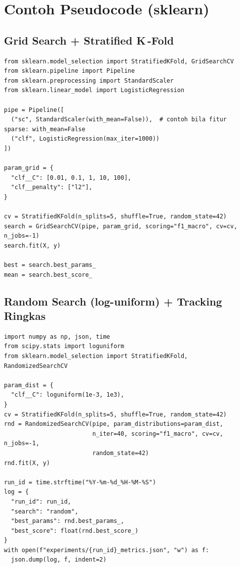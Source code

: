 \documentclass[11pt,a4paper]{article}
\begin{document}
\section{Contoh Pseudocode (sklearn)}
\subsection{Grid Search + Stratified K\,-Fold}
\begin{lstlisting}
from sklearn.model_selection import StratifiedKFold, GridSearchCV
from sklearn.pipeline import Pipeline
from sklearn.preprocessing import StandardScaler
from sklearn.linear_model import LogisticRegression

pipe = Pipeline([
  ("sc", StandardScaler(with_mean=False)),  # contoh bila fitur sparse: with_mean=False
  ("clf", LogisticRegression(max_iter=1000))
])

param_grid = {
  "clf__C": [0.01, 0.1, 1, 10, 100],
  "clf__penalty": ["l2"],
}

cv = StratifiedKFold(n_splits=5, shuffle=True, random_state=42)
search = GridSearchCV(pipe, param_grid, scoring="f1_macro", cv=cv, n_jobs=-1)
search.fit(X, y)

best = search.best_params_
mean = search.best_score_
\end{lstlisting}

\subsection{Random Search (log-uniform) + Tracking Ringkas}
\begin{lstlisting}
import numpy as np, json, time
from scipy.stats import loguniform
from sklearn.model_selection import StratifiedKFold, RandomizedSearchCV

param_dist = {
  "clf__C": loguniform(1e-3, 1e3),
}
cv = StratifiedKFold(n_splits=5, shuffle=True, random_state=42)
rnd = RandomizedSearchCV(pipe, param_distributions=param_dist,
                         n_iter=40, scoring="f1_macro", cv=cv, n_jobs=-1,
                         random_state=42)
rnd.fit(X, y)

run_id = time.strftime("%Y-%m-%d_%H-%M-%S")
log = {
  "run_id": run_id,
  "search": "random",
  "best_params": rnd.best_params_,
  "best_score": float(rnd.best_score_)
}
with open(f"experiments/{run_id}_metrics.json", "w") as f:
  json.dump(log, f, indent=2)
\end{lstlisting}
\end{document}
